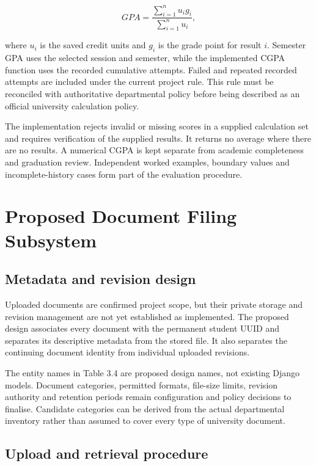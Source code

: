 \begin{equation}
GPA=\frac{\sum_{i=1}^{n}u_i g_i}{\sum_{i=1}^{n}u_i},
\end{equation}

where \(u_i\) is the saved credit units and \(g_i\) is the grade point for result \(i\). Semester GPA uses the selected session and semester, while the implemented CGPA function uses the recorded cumulative attempts. Failed and repeated recorded attempts are included under the current project rule. This rule must be reconciled with authoritative departmental policy before being described as an official university calculation policy.




The implementation rejects invalid or missing scores in a supplied calculation set and requires verification of the supplied results. It returns no average where there are no results. A numerical CGPA is kept separate from academic completeness and graduation review. Independent worked examples, boundary values and incomplete-history cases form part of the evaluation procedure.

\section{Proposed Document Filing Subsystem}\label{sec:3-5}

\subsection{Metadata and revision design}\label{sec:3-5-1}

Uploaded documents are confirmed project scope, but their private storage and revision management are not yet established as implemented. The proposed design associates every document with the permanent student UUID and separates its descriptive metadata from the stored file. It also separates the continuing document identity from individual uploaded revisions.




The entity names in Table 3.4 are proposed design names, not existing Django models. Document categories, permitted formats, file-size limits, revision authority and retention periods remain configuration and policy decisions to finalise. Candidate categories can be derived from the actual departmental inventory rather than assumed to cover every type of university document.

\subsection{Upload and retrieval procedure}\label{sec:3-5-2}

